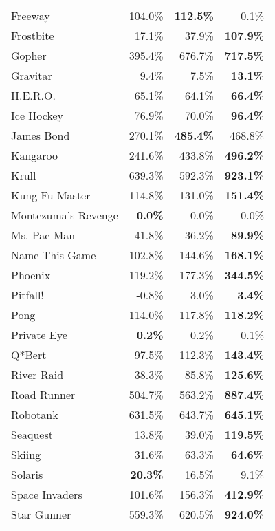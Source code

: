 \begin{table}[h!]
\begin{center}
\begin{tabular}{l|rrr}
             Freeway &   104.0\% &{\bf112.5\%}&     0.1\% \\
           Frostbite &    17.1\% &    37.9\% &{\bf107.9\%}\\
              Gopher &   395.4\% &   676.7\% &{\bf717.5\%}\\
            Gravitar &     9.4\% &     7.5\% &{\bf13.1\%}\\
            H.E.R.O. &    65.1\% &    64.1\% &{\bf66.4\%}\\
          Ice Hockey &    76.9\% &    70.0\% &{\bf96.4\%}\\
          James Bond &   270.1\% &{\bf485.4\%}&   468.8\% \\
            Kangaroo &   241.6\% &   433.8\% &{\bf496.2\%}\\
               Krull &   639.3\% &   592.3\% &{\bf923.1\%}\\
      Kung-Fu Master &   114.8\% &   131.0\% &{\bf151.4\%}\\
 Montezuma's Revenge &{\bf0.0\%}&     0.0\% &     0.0\% \\
         Ms. Pac-Man &    41.8\% &    36.2\% &{\bf89.9\%}\\
      Name This Game &   102.8\% &   144.6\% &{\bf168.1\%}\\
             Phoenix &   119.2\% &   177.3\% &{\bf344.5\%}\\
            Pitfall! &    -0.8\% &     3.0\% &{\bf3.4\%}\\
                Pong &   114.0\% &   117.8\% &{\bf118.2\%}\\
         Private Eye &{\bf0.2\%}&     0.2\% &     0.1\% \\
              Q*Bert &    97.5\% &   112.3\% &{\bf143.4\%}\\
          River Raid &    38.3\% &    85.8\% &{\bf125.6\%}\\
         Road Runner &   504.7\% &   563.2\% &{\bf887.4\%}\\
            Robotank &   631.5\% &   643.7\% &{\bf645.1\%}\\
            Seaquest &    13.8\% &    39.0\% &{\bf119.5\%}\\
              Skiing &    31.6\% &    63.3\% &{\bf64.6\%}\\
             Solaris &{\bf20.3\%}&    16.5\% &     9.1\% \\
      Space Invaders &   101.6\% &   156.3\% &{\bf412.9\%}\\
         Star Gunner &   559.3\% &   620.5\% &{\bf924.0\%}\\

\end{tabular}
\end{center}
\end{table}
